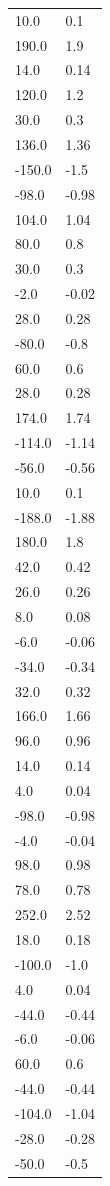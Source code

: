 \begin{longtable}{ll}
10.0 & 0.1 \\
190.0 & 1.9 \\
14.0 & 0.14 \\
120.0 & 1.2 \\
30.0 & 0.3 \\
136.0 & 1.36 \\
-150.0 & -1.5 \\
-98.0 & -0.98 \\
104.0 & 1.04 \\
80.0 & 0.8 \\
30.0 & 0.3 \\
-2.0 & -0.02 \\
28.0 & 0.28 \\
-80.0 & -0.8 \\
60.0 & 0.6 \\
28.0 & 0.28 \\
174.0 & 1.74 \\
-114.0 & -1.14 \\
-56.0 & -0.56 \\
10.0 & 0.1 \\
-188.0 & -1.88 \\
180.0 & 1.8 \\
42.0 & 0.42 \\
26.0 & 0.26 \\
8.0 & 0.08 \\
-6.0 & -0.06 \\
-34.0 & -0.34 \\
32.0 & 0.32 \\
166.0 & 1.66 \\
96.0 & 0.96 \\
14.0 & 0.14 \\
4.0 & 0.04 \\
-98.0 & -0.98 \\
-4.0 & -0.04 \\
98.0 & 0.98 \\
78.0 & 0.78 \\
252.0 & 2.52 \\
18.0 & 0.18 \\
-100.0 & -1.0 \\
4.0 & 0.04 \\
-44.0 & -0.44 \\
-6.0 & -0.06 \\
60.0 & 0.6 \\
-44.0 & -0.44 \\
-104.0 & -1.04 \\
-28.0 & -0.28 \\
-50.0 & -0.5 \\

\end{longtable}
